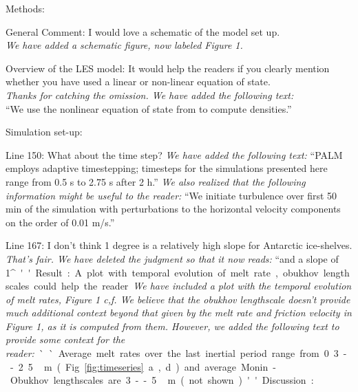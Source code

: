 \documentclass[tc, manuscript]{copernicus}
\begin{document}
Methods:

General Comment: I would love a schematic of the model set up.\\
\textit{We have added a schematic figure, now labeled Figure 1.}

Overview of the LES model: It would help the readers if you clearly mention whether you have used a linear or non-linear equation of state.\\
\textit{Thanks for catching the omission. We have added the following text:}\\
``We use the nonlinear equation of state from  \citet{jackett_algorithms_2006} to compute densities.''

Simulation set-up:

Line 150: What about the time step?
\textit{We have added the following text:}
``PALM employs adaptive timestepping; timesteps for the simulations presented here range from 0.5 s to 2.75 s after 2 h.''
\textit{We also realized that the following information might be useful to the reader:}
``We initiate turbulence over first 50 min of the simulation with perturbations to the horizontal velocity components on the order of 0.01 m/s.''

Line 167: I don’t think 1 degree is a relatively high slope for Antarctic ice-shelves.
\textit{That's fair. We have deleted the judgment so that it now reads:}
``and a slope of 1\unit{^{\circ}}''

Result:

A plot with temporal evolution of melt rate, obukhov lengthscales could help the reader.
\textit{We have included a plot with the temporal evolution of melt rates, Figure 1 c,f. We believe that the obukhov lengthscale doesn't provide much additional context beyond that given by the melt rate and friction velocity in Figure 1, as it is computed from them. However, we added the following text to provide some context for the reader:}
``Average melt rates over the last inertial period range from 0.3--2.5\unit\,{m} (Fig. \ref{fig:timeseries}a,d) and average Monin-Obukhov lengthscales are 3--5\,\unit{m} (not shown).''

Discussion :
\end{document}
